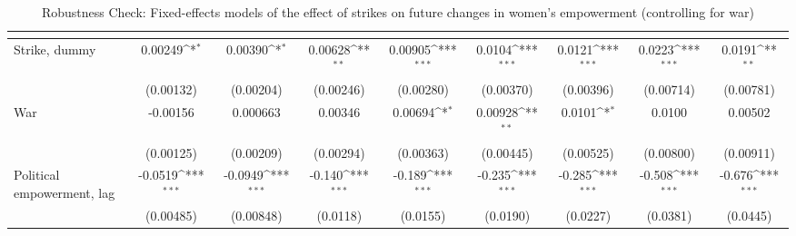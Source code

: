 \begin{table}[htbp]\centering
\def\sym#1{\ifmmode^{#1}\else\(^{#1}\)\fi}
\caption{Robustness Check: Fixed-effects models of the effect of strikes on future changes in women's empowerment (controlling for war) \label{fepolemstrikswar}}
\begin{tabular}{l*{8}{c}}
\hline\hline
                    &&&&&&&&\\
\hline
Strike, dummy          &     0.00249\sym{*}  &     0.00390\sym{*}  &     0.00628\sym{**} &     0.00905\sym{***}&      0.0104\sym{***}&      0.0121\sym{***}&      0.0223\sym{***}&      0.0191\sym{**} \\
                    &   (0.00132)         &   (0.00204)         &   (0.00246)         &   (0.00280)         &   (0.00370)         &   (0.00396)         &   (0.00714)         &   (0.00781)         \\
[1em]
War          &    -0.00156         &    0.000663         &     0.00346         &     0.00694\sym{*}  &     0.00928\sym{**} &      0.0101\sym{*}  &      0.0100         &     0.00502         \\
                    &   (0.00125)         &   (0.00209)         &   (0.00294)         &   (0.00363)         &   (0.00445)         &   (0.00525)         &   (0.00800)         &   (0.00911)         \\
[1em]
Political empowerment, lag  &     -0.0519\sym{***}&     -0.0949\sym{***}&      -0.140\sym{***}&      -0.189\sym{***}&      -0.235\sym{***}&      -0.285\sym{***}&      -0.508\sym{***}&      -0.676\sym{***}\\
                    &   (0.00485)         &   (0.00848)         &    (0.0118)         &    (0.0155)         &    (0.0190)         &    (0.0227)         &    (0.0381)         &    (0.0445)         \\

\end{tabular}
\end{table}
